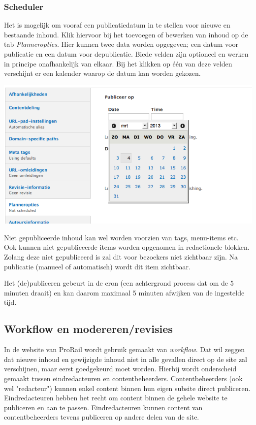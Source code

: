 \subsubsection{Scheduler}
Het is mogelijk om vooraf een publicatiedatum in te stellen voor nieuwe en bestaande inhoud. Klik hiervoor bij het toevoegen of bewerken van inhoud op de tab \emph{Planneropties}. Hier kunnen twee data worden opgegeven; een datum voor publicatie en een datum voor depublicatie. Biede velden zijn optioneel en werken in principe onafhankelijk van elkaar. Bij het klikken op \'{e}\'{e}n van deze velden verschijnt er een kalender waarop de datum kan worden gekozen.
\begin{center}
\includegraphics[width=\textwidth]{img/scheduler.png}
\end{center}
Niet gepubliceerde inhoud kan wel worden voorzien van tags, menu-items etc. Ook kunnen niet gepubliceerde items worden opgenomen in redactionele blokken. Zolang deze niet gepubliceerd is zal dit voor bezoekers niet zichtbaar zijn. Na publicatie (manueel of automatisch) wordt dit item zichtbaar.

Het (de)publiceren gebeurt in de cron (een achtergrond process dat om de 5 minuten draait) en kan daarom maximaal 5 minuten afwijken van de ingestelde tijd.




\subsection{Workflow en modereren/revisies}\label{workflow}
In de website van ProRail wordt gebruik gemaakt van \emph{workflow}. Dat wil zeggen dat nieuwe inhoud en gewijzigde inhoud niet in alle gevallen direct op de site zal verschijnen, maar eerst goedgekeurd moet worden. Hierbij wordt onderscheid gemaakt tussen eindredacteuren en contentbeheerders. Contentbeheerders (ook wel "redacteur") kunnen enkel content binnen hun eigen subsite direct publiceren. Eindredacteuren hebben het recht om content binnen de gehele website te publiceren en aan te passen. Eindredacteuren kunnen content van contentbeheerders tevens publiceren op andere delen van de site.

